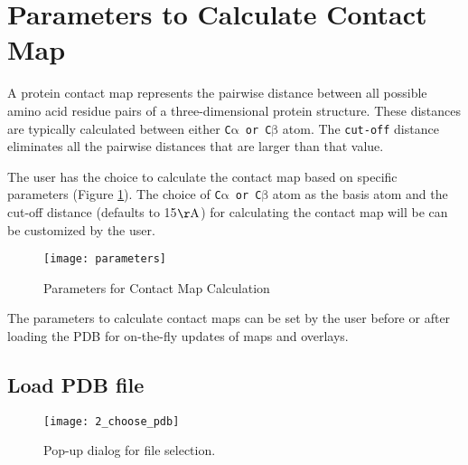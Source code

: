 \documentclass[11pt,fleqn]{book} %
\begin{document}

\section{Parameters to Calculate Contact Map}\label{calculate_map_params}

A protein contact map represents the pairwise distance between all possible amino acid residue pairs of a three-dimensional protein structure. These distances are typically calculated between either \texttt{C$\mathrm{\alpha}$ or C$\mathrm{\beta}$} atom. The \texttt{cut-off} distance eliminates all the pairwise distances that are larger than that value. 

The user has the choice to calculate the contact map based on specific parameters (Figure \ref{contactmapcalculate}). The choice of \texttt{C$\mathrm{\alpha}$ or C$\mathrm{\beta}$} atom as the basis atom and the cut-off distance (defaults to 15$\mathrm{\AA}$) for calculating the contact map will be can be customized by the user.

\begin{figure}[ht!]
\centering
  \begin{minipage}[b]{0.35\textwidth}
  \centering
      \texttt{[image: parameters]}
      \caption{Parameters for Contact Map Calculation}
  \label{contactmapcalculate}
  \end{minipage}
\end{figure}

\begin{remark}
The parameters to calculate contact maps can be set by the user before or after loading the PDB for on-the-fly updates of maps and overlays. 
\end{remark}

\subsection{Load PDB file}
\begin{figure}[ht!]
\centering
  \begin{minipage}{\textwidth}
  \centering
      \texttt{[image: 2\_choose\_pdb]}
      \caption{Pop-up dialog for file selection.}
  \label{choosepdb}
  \end{minipage}
\end{figure}
\end{document}
